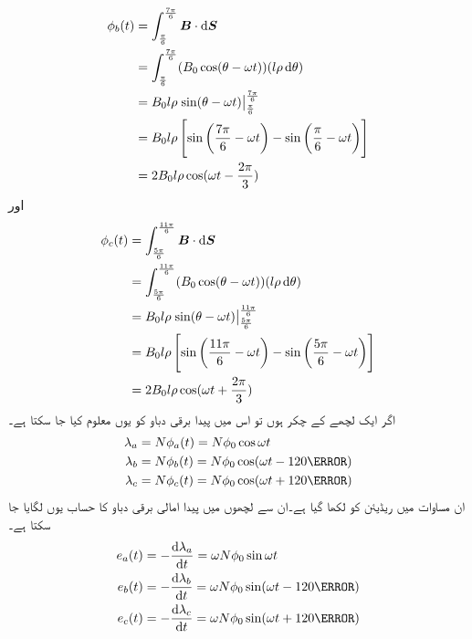 \begin{gather}
\begin{aligned}
\phi_b(t)&=\int_{\frac{\pi}{6}}^{\frac{7\pi}{6}} \kvec{B} \cdot \dif \kvec{S}\\
&=\int_{\frac{\pi}{6}}^{\frac{7\pi}{6}} (B_0 \cos (\theta-\omega t))(l \rho \dif \theta)\\
&=B_0 l \rho \left. \sin (\theta-\omega t) \right|_{\frac{\pi}{6}}^{\frac{7\pi}{6}}\\
&=B_0 l \rho \left[\sin \left(\frac{7\pi}{6}-\omega t \right )-\sin \left (\frac{\pi}{6}-\omega t \right) \right]\\
&=2 B_0 l \rho \cos (\omega t-\frac{2\pi}{3})
\end{aligned}
\end{gather}
اور
\begin{gather}
\begin{aligned}
\phi_c(t)&=\int_{\frac{5\pi}{6}}^{\frac{11\pi}{6}} \kvec{B} \cdot \dif \kvec{S}\\
&=\int_{\frac{5\pi}{6}}^{\frac{11\pi}{6}} (B_0 \cos (\theta-\omega t))(l \rho \dif \theta)\\
&=B_0 l \rho \left. \sin (\theta-\omega t) \right|_{\frac{5\pi}{6}}^{\frac{11\pi}{6}}\\
&=B_0 l \rho \left[\sin \left(\frac{11\pi}{6}-\omega t \right )-\sin \left (\frac{5\pi}{6}-\omega t \right) \right]\\
&=2 B_0 l \rho \cos (\omega t+\frac{2\pi}{3})
\end{aligned}
\end{gather}
اگر ایک لچھے کے  چکر ہوں تو اس میں پیدا برقی دباو کو یوں معلوم کیا جا سکتا ہے۔
\begin{gather}
\begin{aligned}
\lambda_a&=N \phi_a (t)=N \phi_0 \cos \omega t\\
\lambda_b&=N \phi_b (t)=N \phi_0 \cos (\omega t-120\degree)\\
\lambda_c&=N \phi_c (t)=N \phi_0 \cos (\omega t+120\degree)
\end{aligned}
\end{gather}
ان مساوات میں  ریڈیئن کو  لکھا گیا ہے۔ان سے لچھوں میں پیدا امالی برقی دباو کا حساب یوں لگایا جا سکتا ہے۔
\begin{gather}
\begin{aligned}\label{مساوات_گھومتے_مشین_تین_دور_سائن_نما_برقی_دباو_الف}
e_a(t)&=-\frac{\dif \lambda_a}{\dif t}=\omega N \phi_0 \sin \omega t\\
e_b(t)&=-\frac{\dif \lambda_b}{\dif t}=\omega N \phi_0 \sin (\omega t-120\degree)\\
e_c(t)&=-\frac{\dif \lambda_c}{\dif t}=\omega N \phi_0 \sin (\omega t+120\degree)
\end{aligned}
\end{gather}
